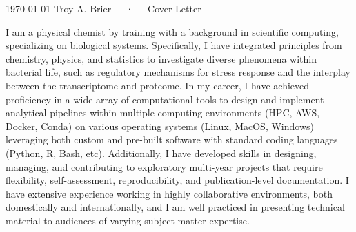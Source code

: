 \documentclass[11pt, a4paper]{awesome-cv}
\begin{document}
	
	\makecvheader[R]
	
	
	\makecvfooter
	{\today}
	{Troy A. Brier~~~·~~~Cover Letter}
	{}
	
	\makelettertitle
	\vspace{-10pt}
	\begin{cvletter}
		I am a physical chemist by training with a background in scientific computing, specializing on biological systems.
		Specifically, I have integrated principles from chemistry, physics, and statistics to investigate diverse phenomena within bacterial life, such as regulatory mechanisms for stress response and the interplay between the transcriptome and proteome.	
		In my career, I have achieved proficiency in a wide array of computational tools to design and implement analytical pipelines within multiple computing environments (HPC, AWS, Docker, Conda) on various operating systems (Linux, MacOS, Windows) leveraging both custom and pre-built software with standard coding languages (Python, R, Bash, etc).
		Additionally, I have developed skills in designing, managing, and contributing to exploratory multi-year projects that require flexibility, self-assessment, reproducibility, and publication-level documentation.
		I have extensive experience working in highly collaborative environments, both domestically and internationally, and I am well practiced in presenting technical material to audiences of varying subject-matter expertise.
		

\end{cvletter}
\end{document}

